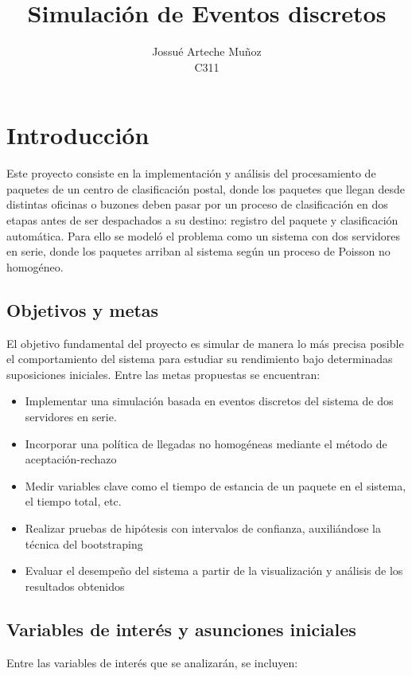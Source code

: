 \documentclass{article}
\title{Simulación de Eventos discretos}
\author{Jossué Arteche Muñoz \\ C311}
\begin{document}
\maketitle

\section{Introducción}

Este proyecto consiste en la implementación y análisis del procesamiento de paquetes de un centro de clasificación postal, donde los paquetes que llegan desde distintas oficinas o buzones deben pasar por un proceso de clasificación en dos etapas antes de ser despachados a su destino: registro del paquete y clasificación automática. Para ello se modeló el problema como un sistema con dos servidores en serie, donde los paquetes arriban al sistema según un proceso de Poisson no homogéneo.

\subsection{Objetivos y metas}
El objetivo fundamental del proyecto es simular de manera lo más precisa posible el comportamiento del sistema para estudiar su rendimiento bajo determinadas suposiciones iniciales. Entre las metas propuestas se encuentran:

\begin{itemize}
\item Implementar una simulación basada en eventos discretos del sistema de dos servidores en serie.
\item Incorporar una política de llegadas no homogéneas mediante el método de aceptación-rechazo
\item Medir variables clave como el tiempo de estancia de un paquete en el sistema, el tiempo total, etc.
\item Realizar pruebas de hipótesis con intervalos de confianza, auxiliándose la técnica del bootstraping
\item Evaluar el desempeño del sistema a partir de la visualización y análisis de los resultados obtenidos
\end{itemize}

\subsection{Variables de interés y asunciones iniciales}
Entre las variables de interés que se analizarán, se incluyen:
\end{document}
